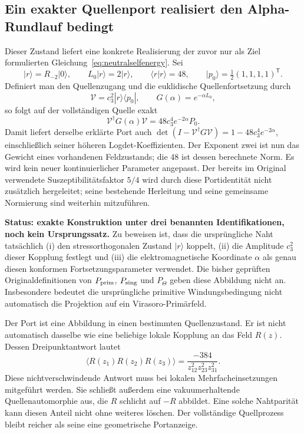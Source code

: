 \subsection{Ein exakter Quellenport realisiert den Alpha-Rundlauf bedingt}\label{sec:heatport}
Dieser Zustand liefert eine konkrete Realisierung der zuvor nur als Ziel formulierten Gleichung~\eqref{eq:neutralselfenergy}. Sei
\begin{equation}
|r\rangle=R_{-2}|0\rangle,\qquad
L_0|r\rangle=2|r\rangle,\qquad
\langle r|r\rangle=48,\qquad
|p_0\rangle=\tfrac12(1,1,1,1)^{\mathsf T}.
\end{equation}
Definiert man den Quellenzugang und die euklidische Quellenfortsetzung durch
\begin{equation}\label{eq:conditionalvertex}
\mathcal V=c_3^2|r\rangle\langle p_0|,\qquad
G(\alpha)=e^{-\alpha L_0},
\end{equation}
so folgt auf der vollständigen Quelle exakt
\begin{equation}\label{eq:actualheatport}
\boxed{\mathcal V^\dagger G(\alpha)\mathcal V
=48c_3^4e^{-2\alpha}P_0.}
\end{equation}
Damit liefert derselbe erklärte Port auch
$\det(I-\mathcal V^\dagger G\mathcal V)=1-48c_3^4e^{-2\alpha}$, einschließlich seiner höheren Logdet-Koeffizienten. Der Exponent zwei ist nun das Gewicht eines vorhandenen Feldzustands; die 48 ist dessen berechnete Norm. Es wird kein neuer kontinuierlicher Parameter angepasst.
Der bereits im Original verwendete Suszeptibilitätsfaktor $5/4$ wird durch diese Portidentität nicht zusätzlich hergeleitet; seine bestehende Herleitung und seine gemeinsame Normierung sind weiterhin mitzuführen.

\textbf{Status: exakte Konstruktion unter drei benannten Identifikationen, noch kein Ursprungssatz.}
Zu beweisen ist, dass die ursprüngliche Naht tatsächlich (i) den stressorthogonalen Zustand $|r\rangle$ koppelt, (ii) die Amplitude $c_3^2$ dieser Kopplung festlegt und (iii) die elektromagnetische Koordinate $\alpha$ als genau diesen konformen Fortsetzungsparameter verwendet. Die bisher geprüften Originaldefinitionen von $P_{\rm prim}$, $P_{\rm sing}$ und $P_\Theta$ geben diese Abbildung nicht an. Insbesondere bedeutet die ursprüngliche primitive Windungsbedingung nicht automatisch die Projektion auf ein Virasoro-Primärfeld.

Der Port ist eine Abbildung in einen bestimmten Quellenzustand. Er ist nicht automatisch dasselbe wie eine beliebige lokale Kopplung an das Feld $R(z)$. Dessen Dreipunktantwort lautet
\begin{equation}
\langle R(z_1)R(z_2)R(z_3)\rangle
=\frac{-384}{z_{12}^2z_{23}^2z_{31}^2}.
\end{equation}
Diese nichtverschwindende Antwort muss bei lokalen Mehrfacheinsetzungen mitgeführt werden. Sie schließt außerdem eine vakuumerhaltende Quellenautomorphie aus, die $R$ schlicht auf $-R$ abbildet. Eine solche Nahtparität kann diesen Anteil nicht ohne weiteres löschen. Der vollständige Quellprozess bleibt reicher als seine eine geometrische Portanzeige.

